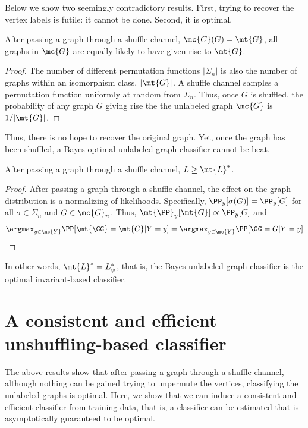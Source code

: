 \documentclass[10pt,journal,cspaper,compsoc]{IEEEtran}
\begin{document}
Below we show two seemingly contradictory results.  First, trying to recover the vertex labels is futile: it cannot be done.  Second, it is optimal.

\begin{thm}
After passing a graph through a shuffle channel, $\mc{C}(G)=\mt{G}$, all graphs in $\mc{G}$ are equally likely to have given rise to $\mt{G}$.
\end{thm}

\begin{proof}
The number of different permutation functions $|\Sigma_n|$ is also the number of graphs within an isomorphism class, $|\mt{G}|$.  A shuffle channel samples a permutation function uniformly at random from $\Sigma_n$.  Thus, once $G$ is shuffled, the probability of any graph $G$ giving rise the the unlabeled graph $\mc{G}$ is $1/|\mt{G}|$.  
\end{proof}

Thus, there is no hope to recover the original graph.  Yet, once the graph has been shuffled, a Bayes optimal unlabeled graph classifier cannot be beat.

\begin{thm}
After passing a graph through a shuffle channel, $L\geq \mt{L}^*$.
\end{thm}

\begin{proof}
After passing a graph through a shuffle channel, the effect on the graph distribution is a normalizing of likelihoods. Specifically, $\PP_y[\sigma(G)]=\PP_y[G]$ for all $\sigma \in \Sigma_n$ and $G \in \mc{G}_n$.  Thus, $\mt{\PP}_y[\mt{G}] \propto \PP_y[G]$ and
\begin{align}
	\argmax_{y\in\mc{Y}} \PP[\mt{\GG}=\mt{G}|Y=y] = \argmax_{y \in \mc{Y}}\PP[\GG=G|Y=y]
\end{align}  
\end{proof}

In other words, $\mt{L}^*=L^*_{\psi}$, that is, the Bayes unlabeled graph classifier is the optimal invariant-based classifier.

\section{A consistent and efficient unshuffling-based classifier} %
\label{sec:bayes_optimal_graph_invariant_based_classifier}

The above results show that after passing a graph through a shuffle channel, although nothing can be gained trying to unpermute the vertices, classifying the unlabeled graphs is optimal.  Here, we show that we can induce a consistent and efficient classifier from training data, that is, a classifier can be estimated that is asymptotically guaranteed to be optimal.
\end{document}
